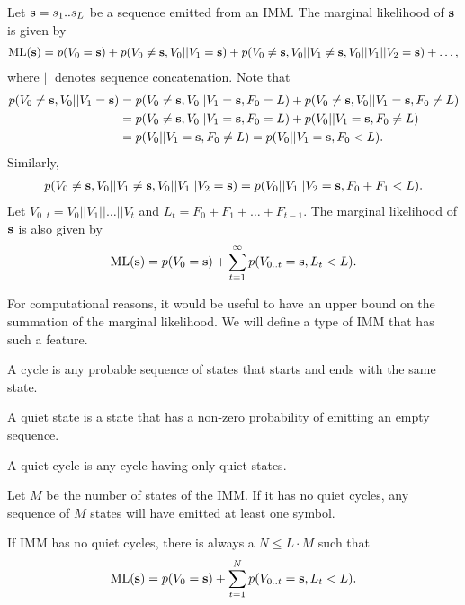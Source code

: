 Let $\mathbf{s}=s_1 .. s_L$ be a sequence emitted from an IMM.
The marginal likelihood of $\mathbf{s}$ is given by
\begin{align}\label{eq:ml}
  \mathrm{ML}(\mathbf{s}) = p(V_0=\mathbf{s}) + p(V_0\neq\mathbf{s}, V_0||V_1=\mathbf{s}) +
  p(V_0\neq\mathbf{s}, V_0||V_1\neq\mathbf{s}, V_0||V_1||V_2=\mathbf{s}) + \dots,
\end{align}
where $||$ denotes sequence concatenation.
Note that
\begin{align*}
  p(V_0 \neq \mathbf{s}, V_0||V_1=\mathbf{s}) &= p(V_0\neq\mathbf{s}, V_0||V_1=\mathbf{s}, F_0=L) +
  p(V_0\neq\mathbf{s}, V_0||V_1=\mathbf{s}, F_0 \neq L)\\
  &= p(V_0\neq\mathbf{s}, V_0||V_1=\mathbf{s}, F_0=L) + p(V_0||V_1=\mathbf{s}, F_0 \neq L)\\
  &= p(V_0||V_1=\mathbf{s}, F_0 \neq L) = p(V_0||V_1=\mathbf{s}, F_0 < L).
\end{align*}
Similarly,
\begin{align*}
  p(V_0\neq\mathbf{s}, V_0||V_1\neq\mathbf{s}, V_0||V_1||V_2=\mathbf{s}) =
  p(V_0||V_1||V_2=\mathbf{s}, F_0+F_1 < L).
\end{align*}
Let $V_{0..t} = V_0||V_1||\dots||V_t$ and $L_t = F_0 + F_1 + \dots + F_{t-1}$.
The marginal likelihood of $\mathbf{s}$ is also given by
\begin{align*}
  \mathrm{ML}(\mathbf{s}) = p(V_0=\mathbf{s}) + \sum_{t=1}^{\infty} p(V_{0..t}=\mathbf{s}, L_t<L).
\end{align*}

For computational reasons, it would be useful to have an upper bound on the summation of the
marginal likelihood.
We will define a type of IMM that has such a feature.

\begin{definition}
  A cycle is any probable sequence of states that starts and ends with the same state.
\end{definition}

\begin{definition}
  A quiet state is a state that has a non-zero probability of emitting an empty sequence.
\end{definition}

\begin{definition}
  A quiet cycle is any cycle having only quiet states.
\end{definition}

\begin{corollary}
  Let $M$ be the number of states of the IMM. If it has no quiet cycles, any sequence of $M$ states
  will have emitted at least one symbol.
\end{corollary}

If IMM has no quiet cycles, there is always a $N \leq L\cdot M$ such that
\begin{align*}
  \mathrm{ML}(\mathbf{s}) = p(V_0=\mathbf{s}) + \sum_{t=1}^N p(V_{0..t}=\mathbf{s}, L_t<L).
\end{align*}
